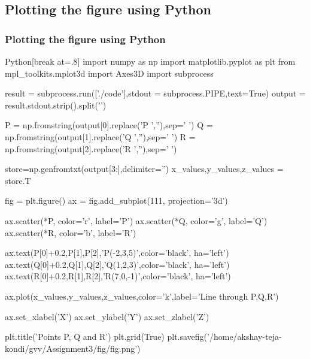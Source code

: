 \documentclass{beamer}
\theoremstyle{remark}
\numberwithin{equation}{section}
\begin{document}
 \subsection{Plotting the figure using Python}
\begin{frame}
\frametitle{Plotting the figure using Python}
   \begin{mintedbox}{Python}[break at=.8\textheight]
import numpy as np
import matplotlib.pyplot as plt
from mpl_toolkits.mplot3d import Axes3D
import subprocess

result = subprocess.run(['./code'],stdout = subprocess.PIPE,text=True)
output = result.stdout.strip().split('\n')

P = np.fromstring(output[0].replace('P ',''),sep=' ')
Q = np.fromstring(output[1].replace('Q ',''),sep=' ')
R = np.fromstring(output[2].replace('R ',''),sep=' ')

store=np.genfromtxt(output[3:],delimiter='')
x_values,y_values,z_values = store.T


fig = plt.figure()
ax = fig.add_subplot(111, projection='3d')

ax.scatter(*P, color='r', label='P')
ax.scatter(*Q, color='g', label='Q')
ax.scatter(*R, color='b', label='R')

ax.text(P[0]+0.2,P[1],P[2],'P(-2,3,5)',color='black', ha='left')
ax.text(Q[0]+0.2,Q[1],Q[2],'Q(1,2,3)',color='black', ha='left')
ax.text(R[0]+0.2,R[1],R[2],'R(7,0,-1)',color='black', ha='left')

ax.plot(x_values,y_values,z_values,color='k',label='Line through P,Q,R')

ax.set_xlabel('X')
ax.set_ylabel('Y')
ax.set_zlabel('Z')

plt.title('Points P, Q and R')
plt.grid(True)
plt.savefig('/home/akshay-teja-kondi/gvv/Assignment3/fig/fig.png')
\end{mintedbox}
\end{frame}
\end{document}
